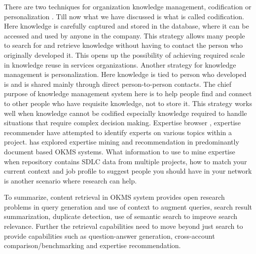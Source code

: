 There are two techniques for organization knowledge management, codification or personalization \cite{hansen2000s}.
Till now what we have discussed is what is called codification. Here knowledge is carefully captured and stored in the database, where it can be accessed and used by anyone in the company. This strategy allows many people to search for and retrieve knowledge without having to contact the person who originally developed it. This opens up the possibility of achieving required scale in knowledge reuse in services organizations. Another strategy for knowledge management is personalization. Here knowledge is  tied to person who developed is and is shared mainly through direct person-to-person contacts. The chief purpose of knowledge management system here is to help people find and connect to other people who have requisite knowledge, not to store it. This strategy works well when knowledge cannot be codified especially knowledge required to handle situations that require complex decision making. Expertise browser \cite{Mockus:2002}, expertise recommender \cite{McDonald:2000} have attempted to identify experts on various topics within a project. \cite{Balog:2006} has explored expertise mining and recommendation in predominantly document based OKMS systems. What information to use to mine expertise when repository contains SDLC data from multiple projects, how to match your current context and job profile to suggest people you should have in your network is another scenario where research can help. 

To summarize, content retrieval in OKMS system provides open research problems in query generation and use of context to augment queries, search result summarization, duplicate detection, use of semantic search to improve search relevance. Further the retrieval capabilities need to move beyond just search to provide capabilities such as question-answer generation, cross-account comparison/benchmarking and expertise recommendation.

